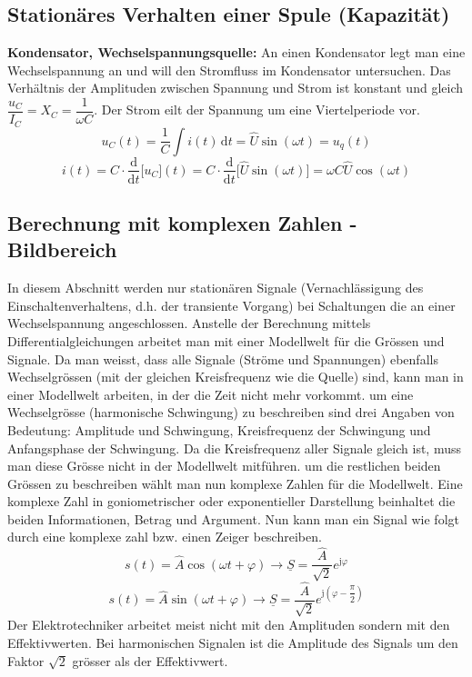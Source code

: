 \subsection{Stationäres Verhalten einer Spule (Kapazität)}
\textbf{Kondensator, Wechselspannungsquelle:} An einen Kondensator legt man eine Wechselspannung an und will den Stromfluss im Kondensator untersuchen. Das Verhältnis der Amplituden zwischen Spannung und Strom ist konstant und gleich $\dfrac{u_C}{I_C}=X_C=\dfrac{1}{\omega C}$. Der Strom eilt der Spannung um eine Viertelperiode vor. 
\begin{equation}
\boxed{u_C\left(t\right)=\dfrac{1}{C} \displaystyle \int i\left(t\right)\,\text{d}t=\hat{U}\sin\left(\omega t\right)=u_q\left(t\right)}
\end{equation}
\begin{equation}
\boxed{i\left(t\right)=C\cdot \dfrac{\text{d}}{\text{d}t}\Big[u_C\Big]\left(t\right)=C\cdot \dfrac{\text{d}}{\text{d}t}\Big[\hat{U}\sin\left(\omega t\right)\Big]=\omega C \hat{U}\cos\left(\omega t\right)}
\end{equation}
\subsection{Berechnung mit komplexen Zahlen - Bildbereich}
In diesem Abschnitt werden nur stationären Signale (Vernachlässigung des Einschaltenverhaltens, d.h. der transiente Vorgang) bei Schaltungen die an einer Wechselspannung angeschlossen. Anstelle der Berechnung mittels Differentialgleichungen arbeitet man mit einer Modellwelt für die Grössen und Signale. Da man weisst, dass alle Signale (Ströme und Spannungen) ebenfalls Wechselgrössen (mit der gleichen Kreisfrequenz wie die Quelle) sind, kann man in einer Modellwelt arbeiten, in der die Zeit nicht mehr vorkommt. um eine Wechselgrösse (harmonische Schwingung) zu beschreiben sind drei Angaben von Bedeutung: Amplitude und Schwingung, Kreisfrequenz der Schwingung und Anfangsphase der Schwingung.
\newline\newline
Da die Kreisfrequenz aller Signale gleich ist, muss man diese Grösse nicht in der Modellwelt mitführen. um die restlichen beiden Grössen zu beschreiben wählt man nun komplexe Zahlen für die Modellwelt. Eine komplexe Zahl in goniometrischer oder exponentieller Darstellung beinhaltet die beiden Informationen, Betrag und Argument. Nun kann man ein Signal wie folgt durch eine komplexe zahl bzw. einen Zeiger beschreiben. 
\begin{equation}
\boxed{s\left(t\right)=\hat{A}\cos\left(\omega t+\varphi\right) \rightarrow \underline{S}=\dfrac{\hat{A}}{\sqrt{2}}e^{\text{j}\varphi}}
\end{equation}
\begin{equation}
\boxed{s\left(t\right)=\hat{A}\sin\left(\omega t+\varphi\right) \rightarrow \underline{S}=\dfrac{\hat{A}}{\sqrt{2}}e^{\text{j}\left(\varphi-\dfrac{\pi}{2}\right)}}
\end{equation}
Der Elektrotechniker arbeitet meist nicht mit den Amplituden sondern mit den Effektivwerten. Bei harmonischen Signalen ist die Amplitude des Signals um den Faktor $\sqrt{2}$ grösser als der Effektivwert.
